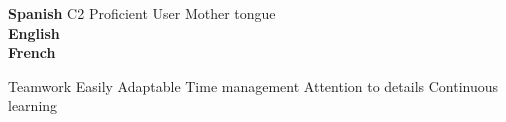\documentclass[9pt, blue]{./template/developercv} %
\begin{document}
\begin{minipage}[t]{0.25\textwidth}
	\vspace{-\baselineskip} %

	\vspace{1.2mm}
	\small \textbf{Spanish} \hfill {\ssmall C2 Proficient User \cpipe Mother tongue \hspace{3pt}} \\

	\vspace{-0.5mm}
	\small \textbf{English} \hfill {} \\

	\vspace{-0.5mm}
	\small \textbf{French} \hfill {} \\



	\itemmarker Teamwork
	\itemmarker Easily Adaptable
	\itemmarker Time management
	\itemmarker Attention to details
	\itemmarker Continuous learning






\end{minipage}










\end{document}
